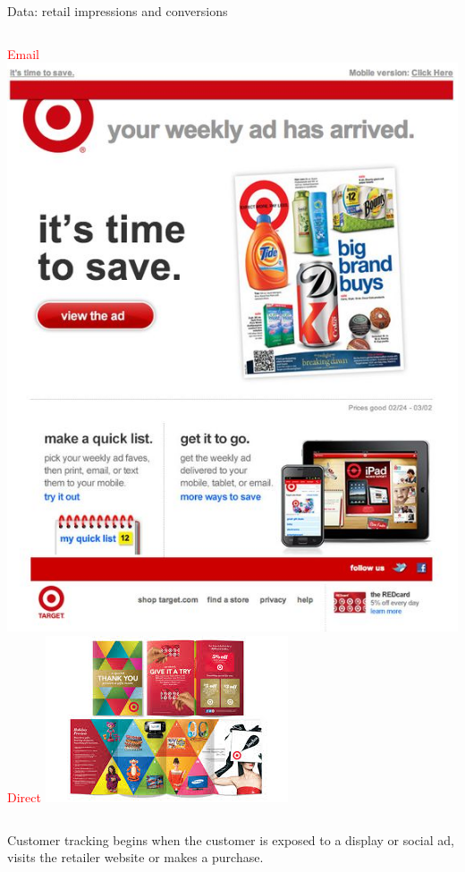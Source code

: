 \documentclass[10pt, aspectratio=169]{beamer}
\begin{document}
\begin{frame}{Data: retail impressions and conversions}
\begin{columns}[T]
\centering
\textcolor{red}{Email}
\includegraphics[width=\textwidth]{images/target_email.jpg}
\centering
\textcolor{red}{Direct}
\includegraphics[width=\textwidth]{images/target_direct.jpeg}
\end{columns}
Customer tracking begins when the customer is exposed to a display or social ad, visits the retailer website or makes a purchase. 
\end{frame}
\end{document}

